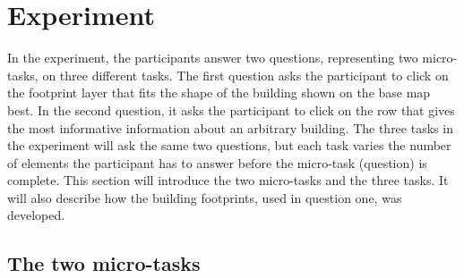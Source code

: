 \section{Experiment}\label{sec:experiment}
In the experiment, the participants answer two questions, representing two micro-tasks, on three different tasks. The first question asks the participant to click on the footprint layer that fits the shape of the building shown on the base map best. In the second question, it asks the participant to click on the row that gives the most informative information about an arbitrary building. The three tasks in the experiment will ask the same two questions, but each task varies the number of elements the participant has to answer before the micro-task (question) is complete. This section will introduce the two micro-tasks and the three tasks. It will also describe how the building footprints, used in question one, was developed. 

\subsection{The two micro-tasks}\label{sec:experimentquestions}

